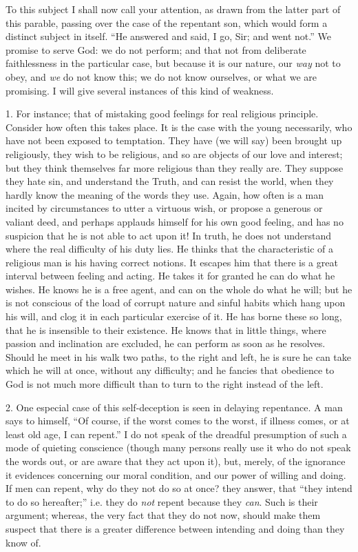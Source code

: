 To this subject I shall now call your attention, as
drawn from the latter part of this parable, passing over
the case of the repentant son, which would form a
distinct subject in itself. ``He answered and said, I
go, Sir; and went not.'' We promise to serve God: we
do not perform; and that not from deliberate
faithlessness in the particular case, but because it is
our nature, our \emph{way} not to obey, and \emph{we} do
not know this; we do not know ourselves, or what we are
promising. I will give several instances of this kind of
weakness.

1. For instance; that of mistaking good feelings for
real religious principle. Consider how often this takes
place. It is the case with the young necessarily, who
have not been exposed to temptation. They have (we will
say) been brought up religiously, they wish to be
religious, and so are objects of our love and interest;
but they think themselves far more religious than they
really are. They suppose they hate sin, and understand the Truth, and can resist the world, when they hardly
know the meaning of the words they use. Again, how often
is a man incited by circumstances to utter a virtuous
wish, or propose a generous or valiant deed, and perhaps
applauds himself for his own good feeling, and has no
suspicion that he is not able to act upon it! In truth,
he does not understand where the real difficulty of his
duty lies. He thinks that the characteristic of a
religious man is his having correct notions. It escapes
him that there is a great interval between feeling and
acting. He takes it for granted he can do what he wishes.
He knows he is a free agent, and can on the whole do what
he will; but he is not conscious of the load of corrupt
nature and sinful habits which hang upon his will, and
clog it in each particular exercise of it. He has borne
these so long, that he is insensible to their existence.
He knows that in little things, where passion and
inclination are excluded, he can perform as soon as he
resolves. Should he meet in his walk two paths, to the
right and left, he is sure he can take which he will at
once, without any difficulty; and he fancies that
obedience to God is not much more difficult than to turn
to the right instead of the left.

2. One especial case of this self-deception is seen in
delaying repentance. A man says to himself, ``Of
course, if the worst comes to the worst, if illness
comes, or at least old age, I can repent.'' I do not
speak of the dreadful presumption of such a mode of
quieting conscience (though many persons really use it
who do not speak the words out, or are aware that they
act upon it), but, merely, of the ignorance it
evidences concerning our moral condition, and our power
of willing and doing. If men can repent, why do they not
do so at once? they answer, that ``they intend to do
so hereafter;'' i.e. they do \emph{not} repent
because they \emph{can}. Such is their argument; whereas,
the very fact that they do not now, should make them
suspect that there is a greater difference between
intending and doing than they know of.

